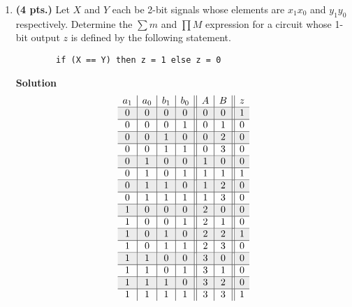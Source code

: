 \begin{enumerate}
                    \item \textbf{ (4 pts.)} Let $X$ and $Y$ each be 2-bit signals whose
                        elements are $x_1 x_0$ and $y_1 y_0$ respectively.  Determine the
                        $\sum m$ and $\prod M$ expression for a circuit whose 1-bit
                        output $z$ is defined by the following statement.
\begin{verbatim}
        if (X == Y) then z = 1 else z = 0
\end{verbatim}
                        \begin{onlysolution}  \textbf{Solution} \itshape
                            $$
                            \begin{array}{c|c|c|c||c|c||c}
                                a_1 & a_0 & b_1 & b_0 & A  & B & z  \\ \hline \rowcolor{gray!15}
                                0 & 0 & 0 & 0 & 0 & 0 & 1           \\ \hline
                                0 & 0 & 0 & 1 & 0 & 1 & 0           \\ \hline \rowcolor{gray!15}
                                0 & 0 & 1 & 0 & 0 & 2 & 0           \\ \hline
                                0 & 0 & 1 & 1 & 0 & 3 & 0           \\ \hline \rowcolor{gray!15}
                                0 & 1 & 0 & 0 & 1 & 0 & 0           \\ \hline
                                0 & 1 & 0 & 1 & 1 & 1 & 1           \\ \hline \rowcolor{gray!15}
                                0 & 1 & 1 & 0 & 1 & 2 & 0           \\ \hline
                                0 & 1 & 1 & 1 & 1 & 3 & 0           \\ \hline \rowcolor{gray!15}
                                1 & 0 & 0 & 0 & 2 & 0 & 0           \\ \hline
                                1 & 0 & 0 & 1 & 2 & 1 & 0           \\ \hline \rowcolor{gray!15}
                                1 & 0 & 1 & 0 & 2 & 2 & 1           \\ \hline
                                1 & 0 & 1 & 1 & 2 & 3 & 0           \\ \hline \rowcolor{gray!15}
                                1 & 1 & 0 & 0 & 3 & 0 & 0           \\ \hline
                                1 & 1 & 0 & 1 & 3 & 1 & 0           \\ \hline \rowcolor{gray!15}
                                1 & 1 & 1 & 0 & 3 & 2 & 0           \\ \hline
                                1 & 1 & 1 & 1 & 3 & 3 & 1           \\
                            \end{array}$$


\end{onlysolution}
\end{enumerate}
